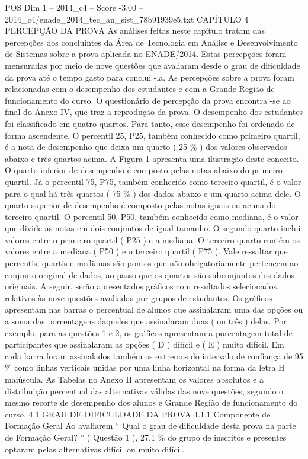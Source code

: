 \begin{textsample}{POS Dim 1 – 2014\_c4 – Score -3.00 – 2014\_c4/enade\_2014\_tec\_an\_sist\_78b91939e5.txt}  \label{ex:f1_pos_317}
CAPÍTULO 4 PERCEPÇÃO DA PROVA As análises feitas neste capítulo tratam das percepções dos concluintes da Área de Tecnologia em Análise e Desenvolvimento de Sistemas sobre a prova aplicada no ENADE/2014.
Estas percepções foram mensuradas por meio de nove questões que avaliaram desde o grau de dificuldade da prova até o tempo gasto para concluí -la.
As percepções sobre a prova foram relacionadas com o desempenho dos estudantes e com a Grande Região de funcionamento do curso.
O questionário de percepção da prova encontra -se ao final do Anexo IV, que traz a reprodução da prova.
O desempenho dos estudantes foi classificado em quatro quartos.
Para tanto, esse desempenho foi ordenado de forma ascendente.
O percentil 25, P25, também conhecido como primeiro quartil, é a nota de desempenho que deixa um quarto ( 25 \% ) dos valores observados abaixo e três quartos acima.
A Figura 1 apresenta uma ilustração deste conceito.
O quarto inferior de desempenho é composto pelas notas abaixo do primeiro quartil.
Já o percentil 75, P75, também conhecido como terceiro quartil, é o valor para o qual há três quartos ( 75 \% ) dos dados abaixo e um quarto acima dele.
O quarto superior de desempenho é composto pelas notas iguais ou acima do terceiro quartil.
O percentil 50, P50, também conhecido como mediana, é o valor que divide as notas em dois conjuntos de igual tamanho.
O segundo quarto inclui valores entre o primeiro quartil ( P25 ) e a mediana.
O terceiro quarto contém os valores entre a mediana ( P50 ) e o terceiro quartil ( P75 ).
Vale ressaltar que percentis, quartis e medianas são pontos que não obrigatoriamente pertencem ao conjunto original de dados, ao passo que os quartos são subconjuntos dos dados originais.
A seguir, serão apresentados gráficos com resultados selecionados, relativos às nove questões avaliadas por grupos de estudantes.
Os gráficos apresentam nas barras o percentual de alunos que assinalaram uma das opções ou a soma das porcentagens daqueles que assinalaram duas ( ou três ) delas.
Por exemplo, para as questões 1 e 2, os gráficos apresentam a porcentagem total de participantes que assinalaram as opções ( D ) difícil e ( E ) muito difícil.
Em cada barra foram assinalados também os extremos do intervalo de confiança de 95 \% como linhas verticais unidas por uma linha horizontal na forma da letra H maiúscula.
As Tabelas no Anexo II apresentam os valores absolutos e a distribuição percentual das alternativas válidas das nove questões, segundo o mesmo recorte de desempenho dos alunos e Grande Região de funcionamento do curso. 4.1 GRAU DE DIFICULDADE DA PROVA 4.1.1 Componente de Formação Geral Ao avaliarem “ Qual o grau de dificuldade desta prova na parte de Formação Geral? ” ( Questão 1 ), 27,1 \% do grupo de inscritos e presentes optaram pelas alternativas difícil ou muito difícil.

\end{textsample}
